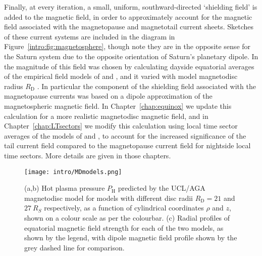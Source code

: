 Finally, at every iteration, a small, uniform, southward-directed `shielding field' is added to the magnetic field, in order to approximately account for the magnetic field associated with the magnetopause and magnetotail current sheets. Sketches of these current systems are included in the diagram in Figure~\ref{intro:fig:magnetosphere}, though note they are in the opposite sense for the Saturn system due to the opposite orientation of Saturn's planetary dipole. In \citet{achilleos2010a} the magnitude of this field was chosen by calculating dayside equatorial averages of the empirical field models of \citet{alexeev2005} and \citet{alexeev2006}, and it varied with model magnetodisc radius $R_\mathrm{D}$ \citep[see][Figure 6]{achilleos2010a}. In particular the component of the shielding field associated with the magnetopause currents was based on a dipole approximation of the magnetospheric magnetic field. In Chapter~\ref{chap:equinox} we update this calculation for a more realistic magnetodisc magnetic field, and in Chapter~\ref{chap:LTsectors} we modify this calculation using local time sector averages of the models of \citet{alexeev2005} and \citet{alexeev2006}, to account for the increased significance of the tail current field compared to the magnetopause current field for nightside local time sectors. More details are given in those chapters.

\begin{figure}
\centering
\texttt{[image: intro/MDmodels.png]}
\caption[Magnetic field structure for $R_\mathrm{D}={21}$ and $\SI{27}{R_S}$ UCL/AGA magnetodisc models.]{(a,b) Hot plasma pressure $P_\mathrm{H}$ predicted by the UCL/AGA magnetodisc model for models with different disc radii $R_\mathrm{D}={21}$ and $\SI{27}{R_S}$ respectively, as a function of cylindrical coordinates $\rho$ and $z$, shown on a colour scale as per the colourbar. (c) Radial profiles of equatorial magnetic field strength for each of the two models, as shown by the legend, with dipole magnetic field profile shown by the grey dashed line for comparison.}
\label{intro:fig:MDmodels}
\end{figure}

